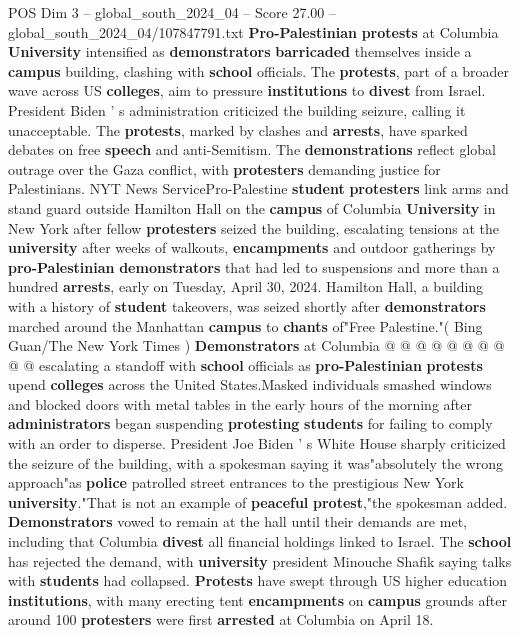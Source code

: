 \begin{textsample}{POS Dim 3 – global\_south\_2024\_04 – Score 27.00 – global\_south\_2024\_04/107847791.txt}  \label{ex:f3_pos_208}
\textbf{Pro-Palestinian} \textbf{protests} at Columbia \textbf{University} intensified as \textbf{demonstrators} \textbf{barricaded} themselves inside a \textbf{campus} building, clashing with \textbf{school} officials.
The \textbf{protests}, part of a broader wave across US \textbf{colleges}, aim to pressure \textbf{institutions} to \textbf{divest} from Israel.
President Biden ' s administration criticized the building seizure, calling it unacceptable.
The \textbf{protests}, marked by clashes and \textbf{arrests}, have sparked debates on free \textbf{speech} and anti-Semitism.
The \textbf{demonstrations} reflect global outrage over the Gaza conflict, with \textbf{protesters} demanding justice for Palestinians.
NYT News ServicePro-Palestine \textbf{student} \textbf{protesters} link arms and stand guard outside Hamilton Hall on the \textbf{campus} of Columbia \textbf{University} in New York after fellow \textbf{protesters} seized the building, escalating tensions at the \textbf{university} after weeks of walkouts, \textbf{encampments} and outdoor gatherings by \textbf{pro-Palestinian} \textbf{demonstrators} that had led to suspensions and more than a hundred \textbf{arrests}, early on Tuesday, April 30, 2024.
Hamilton Hall, a building with a history of \textbf{student} takeovers, was seized shortly after \textbf{demonstrators} marched around the Manhattan \textbf{campus} to \textbf{chants} of"Free Palestine."( Bing Guan/The New York Times ) \textbf{Demonstrators} at Columbia @ @ @ @ @ @ @ @ @ @ escalating a standoff with \textbf{school} officials as \textbf{pro-Palestinian} \textbf{protests} upend \textbf{colleges} across the United States.Masked individuals smashed windows and blocked doors with metal tables in the early hours of the morning after \textbf{administrators} began suspending \textbf{protesting} \textbf{students} for failing to comply with an order to disperse.
President Joe Biden ' s White House sharply criticized the seizure of the building, with a spokesman saying it was"absolutely the wrong approach"as \textbf{police} patrolled street entrances to the prestigious New York \textbf{university}."That is not an example of \textbf{peaceful} \textbf{protest},"the spokesman added. \textbf{Demonstrators} vowed to remain at the hall until their demands are met, including that Columbia \textbf{divest} all financial holdings linked to Israel.
The \textbf{school} has rejected the demand, with \textbf{university} president Minouche Shafik saying talks with \textbf{students} had collapsed. \textbf{Protests} have swept through US higher education \textbf{institutions}, with many erecting tent \textbf{encampments} on \textbf{campus} grounds after around 100 \textbf{protesters} were first \textbf{arrested} at Columbia on April 18.

\end{textsample}
